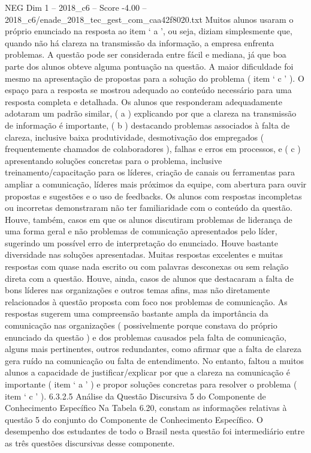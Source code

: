 \begin{textsample}{NEG Dim 1 – 2018\_c6 – Score -4.00 – 2018\_c6/enade\_2018\_tec\_gest\_com\_caa42f8020.txt}
Muitos alunos usaram o próprio enunciado na resposta ao item ‘ a ’, ou seja, diziam simplesmente que, quando não há clareza na transmissão da informação, a empresa enfrenta problemas.
A questão pode ser considerada entre fácil e mediana, já que boa parte dos alunos obteve alguma pontuação na questão.
A maior dificuldade foi mesmo na apresentação de propostas para a solução do problema ( item ‘ c ’ ).
O espaço para a resposta se mostrou adequado ao conteúdo necessário para uma resposta completa e detalhada.
Os alunos que responderam adequadamente adotaram um padrão similar, ( a ) explicando por que a clareza na transmissão de informação é importante, ( b ) destacando problemas associados à falta de clareza, inclusive baixa produtividade, desmotivação dos empregados ( frequentemente chamados de colaboradores ), falhas e erros em processos, e ( c ) apresentando soluções concretas para o problema, inclusive treinamento/capacitação para os líderes, criação de canais ou ferramentas para ampliar a comunicação, líderes mais próximos da equipe, com abertura para ouvir propostas e sugestões e o uso de feedbacks.
Os alunos com respostas incompletas ou incorretas demonstraram não ter familiaridade com o conteúdo da questão.
Houve, também, casos em que os alunos discutiram problemas de liderança de uma forma geral e não problemas de comunicação apresentados pelo líder, sugerindo um possível erro de interpretação do enunciado.
Houve bastante diversidade nas soluções apresentadas.
Muitas respostas excelentes e muitas respostas com quase nada escrito ou com palavras desconexas ou sem relação direta com a questão.
Houve, ainda, casos de alunos que destacaram a falta de bons líderes nas organizações e outros temas afins, mas não diretamente relacionados à questão proposta com foco nos problemas de comunicação.
As respostas sugerem uma compreensão bastante ampla da importância da comunicação nas organizações ( possivelmente porque constava do próprio enunciado da questão ) e dos problemas causados pela falta de comunicação, alguns mais pertinentes, outros redundantes, como afirmar que a falta de clareza gera ruído na comunicação ou falta de entendimento.
No entanto, faltou a muitos alunos a capacidade de justificar/explicar por que a clareza na comunicação é importante ( item ‘ a ’ ) e propor soluções concretas para resolver o problema ( item ‘ c ’ ). 6.3.2.5 Análise da Questão Discursiva 5 do Componente de Conhecimento Específico Na Tabela 6.20, constam as informações relativas à questão 5 do conjunto do Componente de Conhecimento Específico.
O desempenho dos estudantes de todo o Brasil nesta questão foi intermediário entre as três questões discursivas desse componente.

\end{textsample}
